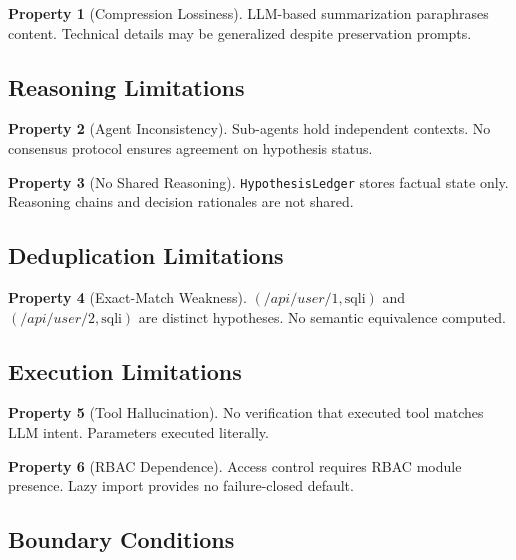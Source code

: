 \documentclass[11pt,a4paper]{article}
\theoremstyle{definition}
\newtheorem{property}{Property}[section]
\newcommand{\code}[1]{\texttt{#1}}
\begin{document}
\begin{property}[Compression Lossiness]
LLM-based summarization paraphrases content. Technical details may be generalized despite preservation prompts.
\end{property}

\subsection{Reasoning Limitations}

\begin{property}[Agent Inconsistency]
Sub-agents hold independent contexts. No consensus protocol ensures agreement on hypothesis status.
\end{property}

\begin{property}[No Shared Reasoning]
\code{HypothesisLedger} stores factual state only. Reasoning chains and decision rationales are not shared.
\end{property}

\subsection{Deduplication Limitations}

\begin{property}[Exact-Match Weakness]
$(/api/user/1, \text{sqli})$ and $(/api/user/2, \text{sqli})$ are distinct hypotheses. No semantic equivalence computed.
\end{property}

\subsection{Execution Limitations}

\begin{property}[Tool Hallucination]
No verification that executed tool matches LLM intent. Parameters executed literally.
\end{property}

\begin{property}[RBAC Dependence]
Access control requires RBAC module presence. Lazy import provides no failure-closed default.
\end{property}

\subsection{Boundary Conditions}
\end{document}
